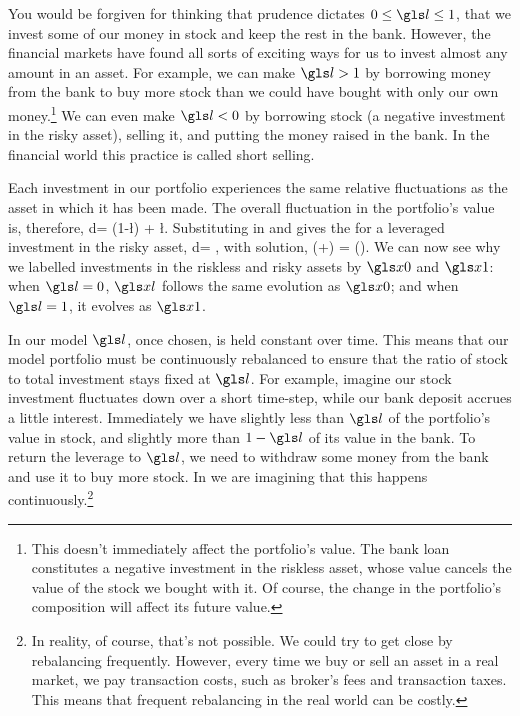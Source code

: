 You would be forgiven for thinking that prudence dictates $0\leq\l\leq1$, \ie that we invest some of our money in stock and keep the rest in the bank. However, the financial markets have found all sorts of exciting ways for us to invest almost any amount in an asset. For example, we can make $\l>1$ by borrowing money from the bank to buy more stock than we could have bought with only our own money.\footnote{This doesn't immediately affect the portfolio's value. The bank loan constitutes a negative investment in the riskless asset, whose value cancels the value of the stock we bought with it. Of course, the change in the portfolio's composition will affect its future value.} We can even make $\l<0$ by borrowing stock (a negative investment in the risky asset), selling it, and putting the money raised in the bank. In the financial world this practice is called short selling.

Each investment in our portfolio experiences the same relative fluctuations as the asset in which it has been made. The overall fluctuation in the portfolio's value is, therefore,
\be
d\xl = (1-\l)\xl {} + \l \xl {}.
\ee
Substituting in  and  gives the \SDE for a leveraged investment in the risky asset,
\be
d\xl = ,
\ee
with solution,
\be
\xl(\tn+\Dt) = \xl(\tn)\exp{}.
\ee
We can now see why we labelled investments in the riskless and risky assets by $\xzero$ and $\xone$: when $\l=0$, $\xl$ follows the same evolution as $\xzero$; and when $\l=1$, it evolves as $\xone$.

In our model $\l$, once chosen, is held constant over time. This means that our model portfolio must be continuously rebalanced to ensure that the ratio of stock to total investment stays fixed at $\l$. For example, imagine our stock investment fluctuates down over a short time-step, while our bank deposit accrues a little interest. Immediately we have slightly less than $\l$ of the portfolio's value in stock, and slightly more than $1-\l$ of its value in the bank. To return the leverage to $\l$, we need to withdraw some money from the bank and use it to buy more stock. In  we are imagining that this happens continuously.\footnote{In reality, of course, that's not possible. We could try to get close by rebalancing frequently. However, every time we buy or sell an asset in a real market, we pay transaction costs, such as broker's fees and transaction taxes. This means that frequent rebalancing in the real world can be costly.}

